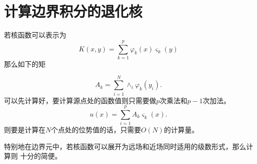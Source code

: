 
\section{计算边界积分的退化核}

若核函数可以表示为\cite{beatson1997short}
\[
K(x,y) = \sum_{k=1}^{p}\varphi_k(x)\varsigma_k(y)
\]
那么如下的矩

\begin{equation}
	A_k = \sum_{i=1}^{N} \wedge_i\varphi_k(y_i).
\end{equation}
可以先计算好，要计算源点处的函数值则只需要做$p$次乘法和$p-1$次加法。
\begin{equation}
	u(x) = \sum_{i=1}^{p}A_k\varsigma_k(x).
\end{equation}
则要是计算在$N$个点处的位势值的话，只需要$O(N)$的计算量。

特别地在边界元中，若核函数可以展开为远场和近场同时适用的级数形式，那么计算则
十分的简便。

\putbib[20120327.sample]             %

\newpage
